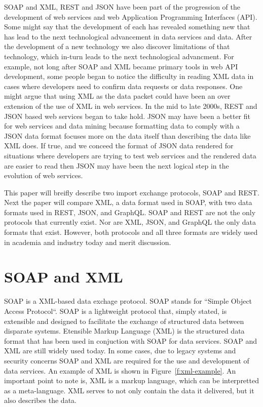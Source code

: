 SOAP and XML, REST and JSON have been part of the progression of the development
of web services and web Application Programming Interfaces (API).  Some might 
say that the development of each has revealed something new that has lead to 
the next technological advancement in data services and data.  After the 
development of a new technology we also discover limitations of that 
technology, which in-turn leads to the next technological advancment.  For 
example, not long after SOAP and XML became primary tools in web API 
development, some people began to notice the difficulty in reading XML data in 
cases where developers need to confirm data requests or data responses.  One 
might argue that using XML as the data packet could have been an over extension 
of the use of XML in web services.  In the mid to late 2000s, REST and JSON 
based web services began to take hold.  JSON may have been a better fit for 
web services and data mining because formatting data to comply with a JSON 
data format focuses more on the data itself than describing the data like XML 
does.  If true, and we conceed the format of JSON data rendered for situations 
where developers are trying to test web services and the rendered data are 
easier to read then JSON may have been the next logical step in the evolution 
of web services.  

This paper will breifly describe two import exchange protocols, SOAP and REST.  
Next the paper will compare XML, a data format used in SOAP, with two data
formats used in REST, JSON, and GraphQL.  SOAP and REST are not the only
protocols that currently exist.  Nor are XML, JSON, and GraphQL the only data
formats that exist.  However, both protocols and all three formats are widely
used in academia and industry today and merit discussion.  

\section{SOAP and XML}
SOAP is a XML-based data exchage protocol\cite{Quaine2007}.  SOAP stands for
``Simple Object Access Protocol``\cite{Microsoft2018}.  SOAP is a lightweight
protocol that, simply stated, is extensible and designed to facilitate the
exchange of structured data between disparate systems\cite{Microsoft2018}.
Etensible Markup Language (XML) is the structured data format that has been
used in conjuction with SOAP for data services\cite{Walsh1998}.  SOAP and XML
are still widely used today.  In some cases, due to legacy systems and security
concerns SOAP and XML are required for the use and development of data services.
An example of XML is shown in Figure~\ref{f:xml-example}\cite{WikipidiaXML1028}.
An important point to note is, XML is a markup language, which can be
interpretted as a meta-language.  XML serves to not only contain the data it
delivered, but it also describes the data\cite{Aihkisalo2012}.

